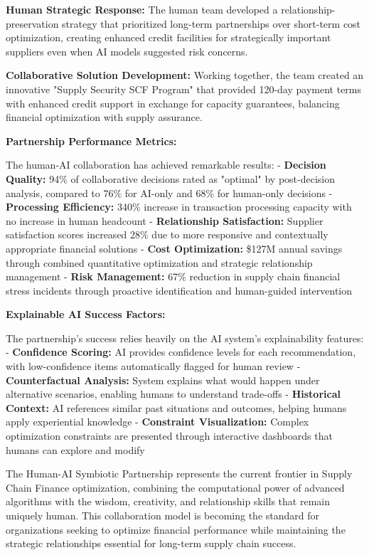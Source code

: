 \documentclass{article}
\begin{document}
\textbf{Human Strategic Response:} The human team developed a relationship-preservation strategy that prioritized long-term partnerships over short-term cost optimization, creating enhanced credit facilities for strategically important suppliers even when AI models suggested risk concerns.

\textbf{Collaborative Solution Development:} Working together, the team created an innovative "Supply Security SCF Program" that provided 120-day payment terms with enhanced credit support in exchange for capacity guarantees, balancing financial optimization with supply assurance.

\textbf{Partnership Performance Metrics:}

The human-AI collaboration has achieved remarkable results:
- \textbf{Decision Quality:} 94\% of collaborative decisions rated as "optimal" by post-decision analysis, compared to 76\% for AI-only and 68\% for human-only decisions
- \textbf{Processing Efficiency:} 340\% increase in transaction processing capacity with no increase in human headcount
- \textbf{Relationship Satisfaction:} Supplier satisfaction scores increased 28\% due to more responsive and contextually appropriate financial solutions
- \textbf{Cost Optimization:} \$127M annual savings through combined quantitative optimization and strategic relationship management
- \textbf{Risk Management:} 67\% reduction in supply chain financial stress incidents through proactive identification and human-guided intervention

\textbf{Explainable AI Success Factors:}

The partnership's success relies heavily on the AI system's explainability features:
- \textbf{Confidence Scoring:} AI provides confidence levels for each recommendation, with low-confidence items automatically flagged for human review
- \textbf{Counterfactual Analysis:} System explains what would happen under alternative scenarios, enabling humans to understand trade-offs
- \textbf{Historical Context:} AI references similar past situations and outcomes, helping humans apply experiential knowledge
- \textbf{Constraint Visualization:} Complex optimization constraints are presented through interactive dashboards that humans can explore and modify

The Human-AI Symbiotic Partnership represents the current frontier in Supply Chain Finance optimization, combining the computational power of advanced algorithms with the wisdom, creativity, and relationship skills that remain uniquely human. This collaboration model is becoming the standard for organizations seeking to optimize financial performance while maintaining the strategic relationships essential for long-term supply chain success.
\end{document}
